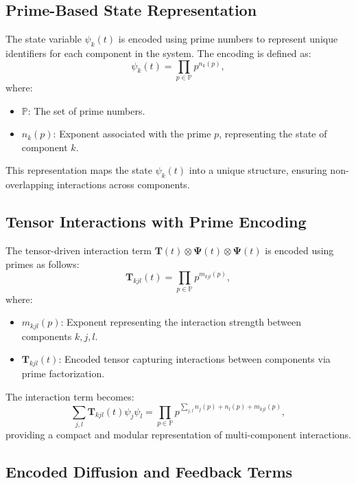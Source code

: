 \documentclass{article}
\theoremstyle{plain}
\begin{document}
\begin{itemize}
\begin{itemize}
\subsection{Prime-Based State Representation}
The state variable \(\psi_k(t)\) is encoded using prime numbers to represent unique identifiers for each component in the system. The encoding is defined as:
\begin{equation}
\psi_k(t) = \prod_{p \in \mathbb{P}} p^{n_k(p)},
\end{equation}
where:
\begin{itemize}
    \item \(\mathbb{P}\): The set of prime numbers.
    \item \(n_k(p)\): Exponent associated with the prime \(p\), representing the state of component \(k\).
\end{itemize}

This representation maps the state \(\psi_k(t)\) into a unique structure, ensuring non-overlapping interactions across components.

\subsection{Tensor Interactions with Prime Encoding}
The tensor-driven interaction term \(\bm{T}(t) \otimes \bm{\Psi}(t) \otimes \bm{\Psi}(t)\) is encoded using primes as follows:
\begin{equation}
\bm{T}_{kjl}(t) = \prod_{p \in \mathbb{P}} p^{m_{kjl}(p)},
\end{equation}
where:
\begin{itemize}
    \item \(m_{kjl}(p)\): Exponent representing the interaction strength between components \(k, j, l\).
    \item \(\bm{T}_{kjl}(t)\): Encoded tensor capturing interactions between components via prime factorization.
\end{itemize}

The interaction term becomes:
\begin{equation}
\sum_{j,l} \bm{T}_{kjl}(t) \psi_j \psi_l = \prod_{p \in \mathbb{P}} p^{\sum_{j,l} n_j(p) + n_l(p) + m_{kjl}(p)},
\end{equation}
providing a compact and modular representation of multi-component interactions.

\subsection{Encoded Diffusion and Feedback Terms}

\end{itemize}
\end{itemize}
\end{document}
